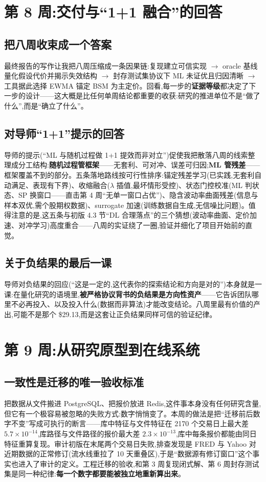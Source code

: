 \documentclass[11pt]{ctexart}
\begin{document}
\section{第 8 周:交付与“1+1 融合”的回答}

\subsection{把八周收束成一个答案}
最终报告的写作让我把八周压缩成一条因果链:复现建立可信实现 $\to$ oracle 基线量化假设代价并揭示失效结构 $\to$ 封存测试集协议下 ML 未证优且归因清晰 $\to$ 工具据此选择 EWMA 锚定 BSM 为主定价。回看,每一步的\textbf{证据等级}都决定了下一步的设计——这大概是比任何单周结论都重要的收获:研究的推进单位不是“做了什么”,而是“确立了什么”。

\subsection{对导师“1+1”提示的回答}
导师的提示(“ML 与随机过程做 1+1 提效而非对立”)促使我把散落八周的线索整理成分工结构:\textbf{随机过程管框架}——无套利、可对冲、误差可归因;\textbf{ML 管残差}——框架覆盖不到的部分。五条落地路线按可行性排序:锚定残差学习(已实践,无套利自动满足、表现有下界)、收缩融合($\lambda$ 插值,最坏情形受控)、状态门控校准(ML 判状态、SP 换窗口——直击第 4 周“无单一窗口占优”)、隐含波动率曲面残差(信息与样本双优,需个股期权数据)、surrogate 加速(训练数据自生成,无信噪比问题)。值得注意的是,这五条与初版 4.3 节“DL 合理落点”的三个猜想(波动率曲面、定价加速、对冲学习)高度重合——八周的实证绕了一圈,验证并细化了项目开始前的直觉。

\subsection{关于负结果的最后一课}
导师对负结果的回应(“这是一定的,这代表你的探索结论和方向是对的”)本身就是一课:在量化研究的语境里,\textbf{被严格协议背书的负结果是方向性资产}——它告诉团队哪里不必再投入、以及投入什么(数据而非算法)才能改变结论。八周里最有价值的产出,可能不是那个 \$29.13,而是这套让正负结果同样可信的验证纪律。

\section{第 9 周:从研究原型到在线系统}

\subsection{一致性是迁移的唯一验收标准}
把数据从文件搬进 PostgreSQL、把报价放进 Redis,这件事本身没有任何研究含量,但它有一个极容易被忽略的失败方式:数字悄悄变了。本周的做法是把“迁移前后数字不变”写成可执行的断言——库中特征与文件特征在 2170 个交易日上最大差 $5.7\times10^{-14}$,库路径与文件路径的报价最大差 $2.3\times10^{-13}$,库中每条报价都能由同日特征重算复现。审计初版在末尾两个交易日失败,排查发现是 FRED 与 Yahoo 对近期数据的正常修订(流水线重拉了 10 天重叠区),于是“数据源有修订窗口”这个事实也进入了审计的定义。工程迁移的验收,和第 3 周复现闭式解、第 6 周封存测试集是同一种纪律:\textbf{每一个数字都要能被独立地重新算出来}。
\end{document}
